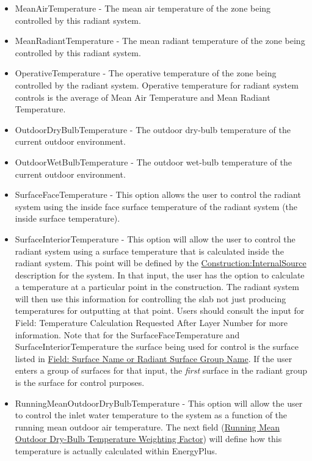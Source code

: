 \begin{itemize}
	\item
	MeanAirTemperature - The mean air temperature of the zone being controlled by this radiant system.
	\item
	MeanRadiantTemperature - The mean radiant temperature of the zone being controlled by this radiant system.
	\item
	OperativeTemperature - The operative temperature of the zone being controlled by the radiant system. Operative temperature for radiant system controls is the average of Mean Air Temperature and Mean Radiant Temperature.
	\item
	OutdoorDryBulbTemperature - The outdoor dry-bulb temperature of the current outdoor environment.
	\item
	OutdoorWetBulbTemperature - The outdoor wet-bulb temperature of the current outdoor environment.
	\item
	SurfaceFaceTemperature - This option allows the user to control the radiant system using the inside face surface temperature of the radiant system (the inside surface temperature).
	\item
	SurfaceInteriorTemperature - This option will allow the user to control the radiant system using a surface temperature that is calculated inside the radiant system.  This point will be defined by the  \hyperref[constructioninternalsource]{Construction:InternalSource} description for the system.  In that input, the user has the option to calculate a temperature at a particular point in the construction.  The radiant system will then use this information for controlling the slab not just producing temperatures for outputting at that point.  Users should consult the input for Field: Temperature Calculation Requested After Layer Number for more information.  Note that for the SurfaceFaceTemperature and SurfaceInteriorTemperature the surface being used for control is the surface listed in \hyperref[field-surface-name-or-radiant-surface-group-name-1]{Field: Surface Name or Radiant Surface Group Name}.  If the user enters a group of surfaces for that input, the \emph{first} surface in the radiant group is the surface for control purposes.
	\item
	RunningMeanOutdoorDryBulbTemperature - This option will allow the user to control the inlet water temperature to the system as a function of the running mean outdoor air temperature.  The next field (\hyperref[field-running-mean-outdoor-dry-bulb-temperature-weighting-factor]{Running Mean Outdoor Dry-Bulb Temperature Weighting Factor}) will define how this temperature is actually calculated within EnergyPlus.
\end{itemize}

